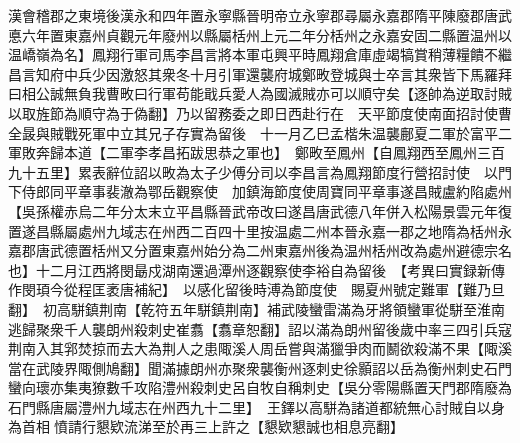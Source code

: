 漢會稽郡之東境後漢永和四年置永寧縣晉明帝立永寧郡尋屬永嘉郡隋平陳廢郡唐武悳六年置東嘉州貞觀元年廢州以縣屬栝州上元二年分栝州之永嘉安固二縣置温州以温嶠嶺為名】鳳翔行軍司馬李昌言將本軍屯興平時鳳翔倉庫虛竭犒賞稍薄糧饋不繼昌言知府中兵少因激怒其衆冬十月引軍還襲府城鄭畋登城與士卒言其衆皆下馬羅拜曰相公誠無負我曹畋曰行軍苟能戢兵愛人為國滅賊亦可以順守矣【逐帥為逆取討賊以取旌節為順守為于偽翻】乃以留務委之即日西赴行在　天平節度使南面招討使曹全晸與賊戰死軍中立其兄子存實為留後　十一月乙巳孟楷朱温襲鄜夏二軍於富平二軍敗奔歸本道【二軍李孝昌拓跋思恭之軍也】　鄭畋至鳳州【自鳳翔西至鳳州三百九十五里】累表辭位詔以畋為太子少傅分司以李昌言為鳳翔節度行營招討使　以門下侍郎同平章事裴澈為鄂岳觀察使　加鎮海節度使周寶同平章事遂昌賊盧約陷處州【吳孫權赤烏二年分太末立平昌縣晉武帝改曰遂昌唐武德八年併入松陽景雲元年復置遂昌縣屬處州九域志在州西二百四十里按温處二州本晉永嘉一郡之地隋為栝州永嘉郡唐武德置栝州又分置東嘉州始分為二州東嘉州後為温州栝州改為處州避德宗名也】十二月江西將閔朂戍湖南還過潭州逐觀察使李裕自為留後　【考異曰實録新傳作閔頊今從程匡袤唐補紀】　以感化留後時溥為節度使　賜夏州號定難軍【難乃旦翻】　初高駢鎮荆南【乾符五年駢鎮荆南】補武陵蠻雷滿為牙將領蠻軍從駢至淮南逃歸聚衆千人襲朗州殺刺史崔翥【翥章恕翻】詔以滿為朗州留後歲中率三四引兵寇荆南入其郛焚掠而去大為荆人之患陬溪人周岳嘗與滿獵爭肉而鬭欲殺滿不果【陬溪當在武陵界陬側鳩翻】聞滿據朗州亦聚衆襲衡州逐刺史徐顥詔以岳為衡州刺史石門蠻向瓌亦集夷獠數千攻陷澧州殺刺史呂自牧自稱刺史【吳分零陽縣置天門郡隋廢為石門縣唐屬澧州九域志在州西九十二里】　王鐸以高駢為諸道都統無心討賊自以身為首相憤請行懇欵流涕至於再三上許之【懇欵懇誠也相息亮翻】


